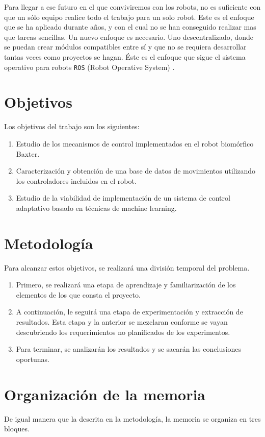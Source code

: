 Para llegar a ese futuro en el que conviviremos con los robots, no es suficiente con que un sólo equipo realice todo el trabajo para un solo robot. Este es el enfoque que se ha aplicado durante años, y con el cual no se han conseguido realizar mas que tareas sencillas. Un nuevo enfoque es necesario. Uno descentralizado, donde se puedan crear módulos compatibles entre sí y que no se requiera desarrollar tantas veces como proyectos se hagan. Éste es el enfoque que sigue el sistema operativo para robots \texttt{ROS} (Robot Operative System) \cite{ros}.

\section{Objetivos}
Los objetivos del trabajo son los siguientes:
\begin{enumerate}
	\item Estudio de los mecanismos de control implementados en el robot biomórfico Baxter.
	\item Caracterización y obtención de una base de datos de movimientos utilizando los controladores incluidos en el robot.
	\item Estudio de la viabilidad de implementación de un sistema de control adaptativo basado en técnicas de machine learning.
\end{enumerate}
\section{Metodología}
Para alcanzar estos objetivos, se realizará una división temporal del problema.

\begin{enumerate}
	\item  Primero, se realizará una etapa de aprendizaje y familiarización de los elementos de los que consta el proyecto.
	
	\item  A continuación, le seguirá una etapa de experimentación y extracción de resultados. Esta etapa y la anterior se mezclaran conforme se vayan descubriendo los requerimientos no planificados de los experimentos.
	
	\item  Para terminar, se analizarán los resultados y se sacarán las conclusiones oportunas.
\end{enumerate}
\section{Organización de la memoria}
De igual manera que la descrita en la metodología, la memoria se organiza en tres bloques.

